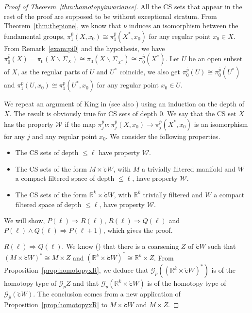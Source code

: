 \documentclass[a4paper,10pt,english,reqno]{amsart}
\theoremstyle{plain}
\theoremstyle{definition}
\theoremstyle{remark}
\numberwithin{equation}{section}
\newcommand{\thmref}[1]{Theorem~\ref{#1}}
\newcommand{\propref}[1]{Proposition~\ref{#1}}
\newcommand{\remref}[1]{Remark~\ref{#1}}
\def\R{{\mathbb R}}
\def\ov{\overline}
\def\cW{{\mathcal W}}
\def\crG{{\mathscr G}}
\def\tc{{\mathtt c}}
\def\R{\mathbb{R}}
\def\rc{{\mathring{\tc}}}
\def\menos{\backslash}
\renewcommand\1{\hbox{\ding{192}}}
\renewcommand\2{\hbox{\ding{193}}}
\newcommand\3{\hbox{\ding{194}}}
\newcommand\4{\hbox{\ding{195}}}
\begin{document}
\begin{proof}[Proof of \thmref{thm:homotopyinvariance}]
 All the CS sets that appear in the rest of the proof are supposed to be without exceptional stratum.
From \thmref{thm:thepione}, we know that $\nu$ induces an isomorphism between the fundamental groups,
$\pi_{1}^{\ov{p}}(X,x_{0})\cong \pi_{1}^{\ov{p}}(X^*,x_{0})$ for any regular point $x_{0}\in X$. From \remref{exam:pi0} and the hypothesis, we have
$\pi_{0}^{\ov{p}}(X)=\pi_{0}(X\menos\Sigma_{X})\cong \pi_{0}(X\menos\Sigma_{X^*})\cong \pi_{0}^{\ov{p}}(X^*)$.
Let $U$ be an open subset of $X$, as the regular parts of $U$ and $U^*$ coincide, 
we also get $\pi_{0}^{\ov{p}}(U)\cong \pi_{0}^{\ov{p}}(U^*)$ and
$\pi_{1}^{\ov{p}}(U,x_{0})\cong \pi_{1}^{\ov{p}}(U^*,x_{0})$ for any regular point $x_{0}\in U$.

We  repeat an argument of  King in \cite[Section 3]{MR800845}
(see also \cite[Theorem 5.5.1]{FriedmanBook}) using
an induction on the depth of $X$. The result is obviously true for CS sets of depth 0.
%
We say that the CS set $X$ has the property $\cW$ if the map
$\pi_{j}^{\ov{p}}\nu\colon\pi_{j}^{\ov{p}}(X,x_{0})\to \pi_{j}^{\ov{p}}(X^*,x_{0})$
is an isomorphism for any $j$ and any regular point $x_{0}$. 
%
We consider the following properties.
\begin{itemize}
\item[$P(\ell)$:] The CS sets of depth $\leq \ell$ have property $\cW$.
\item[$Q(\ell)$:] The CS sets of the form $M \times \rc W$, with $M$ a trivially filtered manifold 
and $W$ a compact filtered space of  depth $\leq \ell$,  have property $\cW$.
\item[$R(\ell)$:] The CS sets of the form $\R^k \times \rc W$, with $\R^k$  trivially filtered  
and $W$ a compact filtered space of  depth $\leq \ell$,  have property $\cW$.
\end{itemize}
We will show,
$P(\ell) \Rightarrow R(\ell)$,
$R(\ell) \Rightarrow Q(\ell)$
and 
$P(\ell) \wedge Q(\ell) \Rightarrow P(\ell+1)$,
which gives the proof.

\medskip
$R(\ell) \Rightarrow Q(\ell)$. 
We know (\cite[Lemma 2]{MR800845})  that there is a coarsening $Z$ of $\rc W$ such that 
$(M\times \rc W)^*\cong M\times Z$ and $(\R^k\times \rc W)^*\cong \R^k\times Z$.
From \propref{prop:homotopyxR}, 
we deduce that $\crG_{\ov{p}}((\R^k\times \rc W)^*)$ is of the homotopy type of $\crG_{\ov{p}}Z$
and that $\crG_{\ov{p}}(\R^k\times \rc W)$ is of the homotopy type of $\crG_{\ov{p}}(\rc W)$.
The conclusion comes from a new application of \propref{prop:homotopyxR} to
$M\times \rc W$ and $M\times Z$.


\end{proof}
\end{document}
